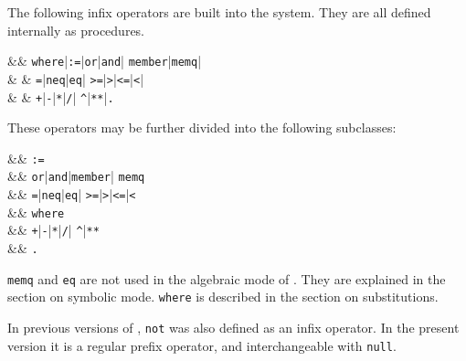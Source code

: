 The following infix operators are built into the
system.  They are all defined internally as procedures.
\begin{syntaxtable}
 &\BNFprod & \texttt{where}|\texttt{:=}|\texttt{or}|\texttt{and}|%
                                  \texttt{member}|\texttt{memq}|\\
                      &         & \texttt{=}|\texttt{neq}|\texttt{eq}|%
                                  \texttt{>=}|\texttt{>}|\texttt{<=}|\texttt{<}|\\
                      &         & \texttt{+}|\texttt{-}|\texttt{*}|\texttt{/}|%
                                  \texttt{\textasciicircum}|\texttt{**}|\texttt{.}
\end{syntaxtable}
These operators may be further divided into the following subclasses:
\begin{syntaxtable}
      &\BNFprod & \texttt{:=} \\
         &\BNFprod & \texttt{or}|\texttt{and}|\texttt{member}|%
                                            \texttt{memq} \\
      &\BNFprod & \texttt{=}|\texttt{neq}|\texttt{eq}|%
                                            \texttt{>=}|\texttt{>}|\texttt{<=}|\texttt{<}\\
    &\BNFprod & \texttt{where} \\
      &\BNFprod & \texttt{+}|\texttt{-}|\texttt{*}|\texttt{/}|%
                                            \texttt{\textasciicircum}|\texttt{**} \\
    &\BNFprod & \texttt{.}
\end{syntaxtable}
\texttt{memq} and \texttt{eq} are not used in the algebraic mode of
{\REDUCE}.  They are explained in the section on symbolic mode.
\texttt{where} is described in the section on substitutions.

In previous versions of {\REDUCE}, \texttt{not} was also defined as an infix
operator.  In the present version it is a regular prefix operator, and
interchangeable with \texttt{null}.

